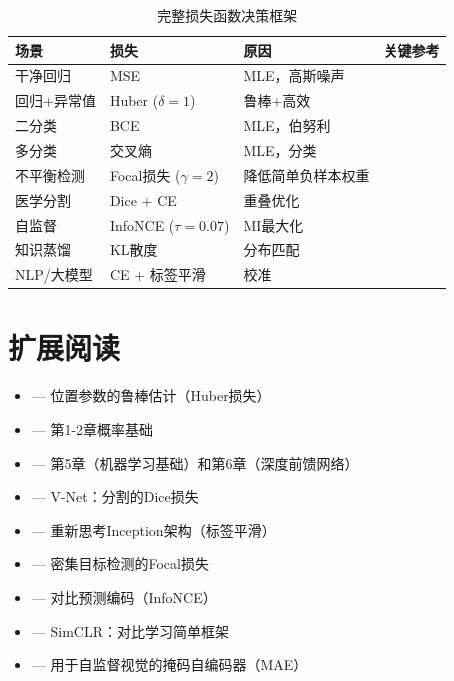 \begin{table}[ht]
    \centering
    \caption{完整损失函数决策框架}
    \begin{tabular}{L{3cm} L{3cm} L{4cm} L{3cm}}
        \toprule
        \textbf{场景} & \textbf{损失} & \textbf{原因} & \textbf{关键参考} \\
        \midrule
        干净回归 & MSE & MLE，高斯噪声 & \\
        回归+异常值 & Huber ($\delta=1$) & 鲁棒+高效 & \cite{huber1964robust} \\
        二分类 & BCE & MLE，伯努利 & \\
        多分类 & 交叉熵 & MLE，分类 & \\
        不平衡检测 & Focal损失 ($\gamma=2$) & 降低简单负样本权重 & \cite{lin2017focal} \\
        医学分割 & Dice + CE & 重叠优化 & \cite{milletari2016v} \\
        自监督 & InfoNCE ($\tau=0.07$) & MI最大化 & \cite{chen2020simple} \\
        知识蒸馏 & KL散度 & 分布匹配 & \\
        NLP/大模型 & CE + 标签平滑 & 校准 & \cite{szegedy2016rethinking} \\
        \bottomrule
    \end{tabular}
\end{table}

\section{扩展阅读}

\begin{itemize}
    \item \cite{huber1964robust} --- 位置参数的鲁棒估计（Huber损失）
    \item \cite{bishop2006pattern} --- 第1-2章概率基础
    \item \cite{goodfellow2016deep} --- 第5章（机器学习基础）和第6章（深度前馈网络）
    \item \cite{milletari2016v} --- V-Net：分割的Dice损失
    \item \cite{szegedy2016rethinking} --- 重新思考Inception架构（标签平滑）
    \item \cite{lin2017focal} --- 密集目标检测的Focal损失
    \item \cite{oord2018representation} --- 对比预测编码（InfoNCE）
    \item \cite{chen2020simple} --- SimCLR：对比学习简单框架
    \item \cite{he2020masked} --- 用于自监督视觉的掩码自编码器（MAE）
\end{itemize}

